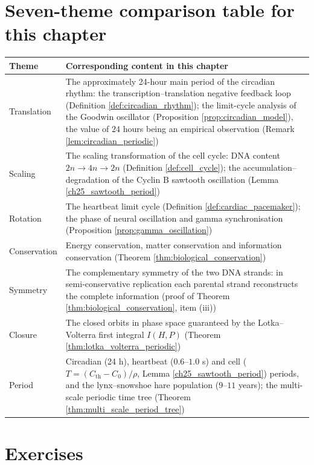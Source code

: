 \section*{Seven-theme comparison table for this chapter}

\begin{center}
\begin{tabular}{>{\centering\arraybackslash}p{2.8cm}>{\centering\arraybackslash}p{9.9cm}}
\toprule
Theme & Corresponding content in this chapter \\
\midrule
Translation & The approximately 24-hour main period of the circadian rhythm: the transcription--translation negative feedback loop (Definition \ref{def:circadian_rhythm}); the limit-cycle analysis of the Goodwin oscillator (Proposition \ref{prop:circadian_model}), the value of $24$ hours being an empirical observation (Remark \ref{lem:circadian_periodic}) \\
Scaling & The scaling transformation of the cell cycle: DNA content $2n \to 4n \to 2n$ (Definition \ref{def:cell_cycle}); the accumulation--degradation of the Cyclin B sawtooth oscillation (Lemma \ref{ch25_sawtooth_period}) \\
Rotation & The heartbeat limit cycle (Definition \ref{def:cardiac_pacemaker}); the phase of neural oscillation and gamma synchronisation (Proposition \ref{prop:gamma_oscillation}) \\
Conservation & Energy conservation, matter conservation and information conservation (Theorem \ref{thm:biological_conservation}) \\
Symmetry & The complementary symmetry of the two DNA strands: in semi-conservative replication each parental strand reconstructs the complete information (proof of Theorem \ref{thm:biological_conservation}, item (iii)) \\
Closure & The closed orbits in phase space guaranteed by the Lotka--Volterra first integral $I(H,P)$ (Theorem \ref{thm:lotka_volterra_periodic}) \\
Period & Circadian (24 h), heartbeat ($0.6$--$1.0$ s) and cell ($T=(C_{\text{th}}-C_0)/\rho$, Lemma \ref{ch25_sawtooth_period}) periods, and the lynx--snowshoe hare population ($9$--$11$ years); the multi-scale periodic time tree (Theorem \ref{thm:multi_scale_period_tree}) \\
\bottomrule
\end{tabular}
\end{center}

\section*{Exercises}

